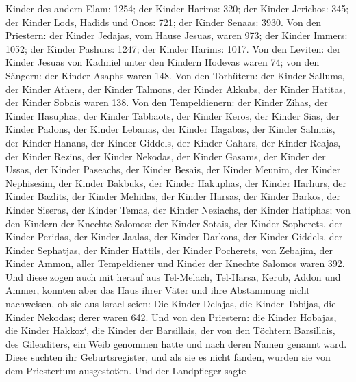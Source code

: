 Kinder des andern Elam: 1254;  der Kinder Harims: 320;
 der Kinder Jerichos: 345;  der Kinder
Lods, Hadids und Onos: 721;  der Kinder Senaas: 3930.
 Von den Priestern: der Kinder Jedajas, vom Hause Jesuas,
waren 973;  der Kinder Immers: 1052;  der
Kinder Pashurs: 1247;  der Kinder Harims: 1017.
 Von den Leviten: der Kinder Jesuas von Kadmiel unter den
Kindern Hodevas waren 74;  von den Sängern: der Kinder
Asaphs waren 148.  Von den Torhütern: der Kinder Sallums,
der Kinder Athers, der Kinder Talmons, der Kinder Akkubs, der Kinder
Hatitas, der Kinder Sobais waren 138.  Von den
Tempeldienern: der Kinder Zihas, der Kinder Hasuphas, der Kinder
Tabbaots,  der Kinder Keros, der Kinder Sias, der Kinder
Padons,  der Kinder Lebanas, der Kinder Hagabas, der
Kinder Salmais,  der Kinder Hanans, der Kinder Giddels,
 der Kinder Gahars, der Kinder Reajas, der Kinder Rezins,
der Kinder Nekodas,  der Kinder Gasams, der Kinder der
Ussas,  der Kinder Paseachs, der Kinder Besais, der
Kinder Meunim, der Kinder Nephisesim,  der Kinder
Bakbuks, der Kinder Hakuphas, der Kinder Harhurs,  der
Kinder Bazlits, der Kinder Mehidas,  der Kinder Harsas,
der Kinder Barkos, der Kinder Siseras, der Kinder Temas, 
der Kinder Neziachs, der Kinder Hatiphas;  von den
Kindern der Knechte Salomos: der Kinder Sotais, der Kinder Sopherets,
 der Kinder Peridas, der Kinder Jaalas, der Kinder
Darkons, der Kinder Giddels,  der Kinder Sephatjas, der
Kinder Hattils, der Kinder Pocherets, von Zebajim, der Kinder Ammon,
 aller Tempeldiener und Kinder der Knechte Salomos waren
392.  Und diese zogen auch mit herauf aus Tel-Melach,
Tel-Harsa, Kerub, Addon und Ammer, konnten aber das Haus ihrer Väter und
ihre Abstammung nicht nachweisen, ob sie aus Israel seien:
 Die Kinder Delajas, die Kinder Tobijas, die Kinder
Nekodas; derer waren 642.  Und von den Priestern: die
Kinder Hobajas, die Kinder Hakkoz`, die Kinder der Barsillais, der von
den Töchtern Barsillais, des Gileaditers, ein Weib genommen hatte und
nach deren Namen genannt ward.  Diese suchten ihr
Geburtsregister, und als sie es nicht fanden, wurden sie von dem
Priestertum ausgestoßen.  Und der Landpfleger sagte
